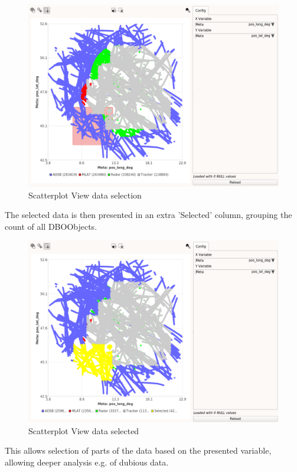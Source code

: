 \begin{figure}[H]
    \hspace*{-2cm}
    \includegraphics[width=18cm,frame]{figures/scatter_select.png}
  \caption{Scatterplot View data selection}
\end{figure}

The selected data is then presented in an extra 'Selected' column, grouping the count of all DBOObjects.

\begin{figure}[H]
    \hspace*{-2cm}
    \includegraphics[width=18cm,frame]{figures/scatter_selected.png}
  \caption{Scatterplot View data selected}
\end{figure}

This allows selection of parts of the data based on the presented variable, allowing deeper analysis e.g. of dubious data. \\

